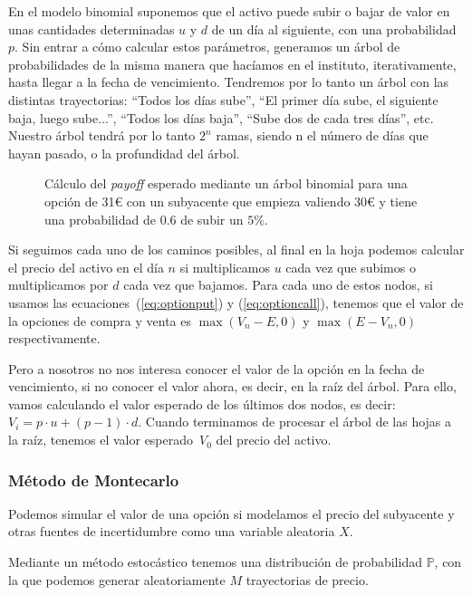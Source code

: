 En el modelo binomial suponemos que el activo puede subir o bajar de valor en unas cantidades determinadas $u$ y $d$ de un día al siguiente, con una probabilidad $p$. Sin entrar a cómo calcular estos parámetros, generamos un árbol de probabilidades de la misma manera que hacíamos en el instituto, iterativamente, hasta llegar a la fecha de vencimiento. Tendremos por lo tanto un árbol con las distintas trayectorias: ``Todos los días sube'', ``El primer día sube, el siguiente baja, luego sube...'', ``Todos los días baja'', ``Sube dos de cada tres días'', etc. Nuestro árbol tendrá por lo tanto $2^n$ ramas, siendo n el número de días que hayan pasado, o la profundidad del árbol. 

\begin{figure}[h]
    \centering
    
    \caption{Cálculo del \textit{payoff} esperado mediante un árbol binomial para una opción de 31€ con un subyacente que empieza valiendo 30€ y tiene una probabilidad de 0.6 de subir un $5\%$.}
\end{figure}
Si seguimos cada uno de los caminos posibles, al final en la hoja podemos calcular el precio del activo en el día $n$ si multiplicamos $u$ cada vez que subimos o multiplicamos por $d$ cada vez que bajamos. Para cada uno de estos nodos, si usamos las ecuaciones~(\ref{eq:optionput}) y (\ref{eq:optioncall}), tenemos que el valor de la opciones de compra y venta es $\max\left(V_n - E,0\right)$ y $\max\left(E-V_n,0\right)$ respectivamente. 

Pero a nosotros no nos interesa conocer el valor de la opción en la fecha de vencimiento, si no conocer el valor ahora, es decir, en la raíz del árbol. Para ello, vamos calculando el valor esperado de los últimos dos nodos, es decir: $V_i=p\cdot u + (p-1)\cdot d$. Cuando terminamos de procesar el árbol de las hojas a la raíz, tenemos el valor esperado~$V_0$ del precio del activo.

\subsubsection{Método de Montecarlo}
Podemos simular el valor de una opción si modelamos el precio del subyacente y otras fuentes de incertidumbre como una variable aleatoria $X$.

Mediante un método estocástico tenemos una distribución de probabilidad $\mathbb{P}$, con la que podemos generar aleatoriamente $M$ trayectorias de precio.

